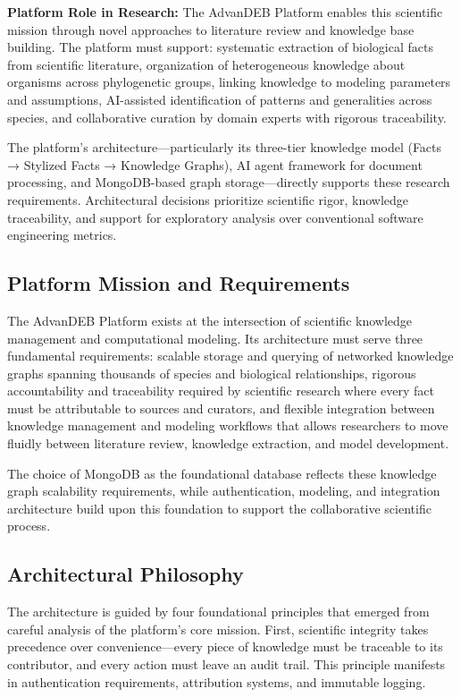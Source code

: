 \documentclass[12pt,a4paper]{article}
\begin{document}
\textbf{Platform Role in Research:} The AdvanDEB Platform enables this scientific mission through novel approaches to literature review and knowledge base building. The platform must support: systematic extraction of biological facts from scientific literature, organization of heterogeneous knowledge about organisms across phylogenetic groups, linking knowledge to modeling parameters and assumptions, AI-assisted identification of patterns and generalities across species, and collaborative curation by domain experts with rigorous traceability.

The platform's architecture—particularly its three-tier knowledge model (Facts → Stylized Facts → Knowledge Graphs), AI agent framework for document processing, and MongoDB-based graph storage—directly supports these research requirements. Architectural decisions prioritize scientific rigor, knowledge traceability, and support for exploratory analysis over conventional software engineering metrics.

\subsection{Platform Mission and Requirements}

The AdvanDEB Platform exists at the intersection of scientific knowledge management and computational modeling. Its architecture must serve three fundamental requirements: scalable storage and querying of networked knowledge graphs spanning thousands of species and biological relationships, rigorous accountability and traceability required by scientific research where every fact must be attributable to sources and curators, and flexible integration between knowledge management and modeling workflows that allows researchers to move fluidly between literature review, knowledge extraction, and model development.

The choice of MongoDB as the foundational database reflects these knowledge graph scalability requirements, while authentication, modeling, and integration architecture build upon this foundation to support the collaborative scientific process.

\subsection{Architectural Philosophy}

The architecture is guided by four foundational principles that emerged from careful analysis of the platform's core mission. First, scientific integrity takes precedence over convenience—every piece of knowledge must be traceable to its contributor, and every action must leave an audit trail. This principle manifests in authentication requirements, attribution systems, and immutable logging.
\end{document}

